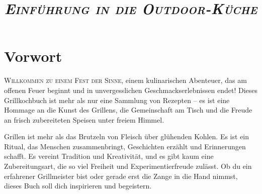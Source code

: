 \documentclass[pdftext, bcor=7mm, ngerman]{scrbook}
\begin{document}





\begin{titlepage}
	\subject{\huge\textsc{\emph{Kochen in kurzen Hosen}}}
	\title{\Huge\textrm{\textsc{\emph{Einführung in die Outdoor-Küche}}}}
    \date{}
\end{titlepage}
\dedication{Für meine Familie und lieben Freunde, \\
die mutig und selbstlos die neusten Kreationen kosten\\}

\maketitle



\frontmatter




\chapter{Vorwort}
\lettrine[lines=3]{W}{illkommen zu einem Fest der Sinne,} einem kulinarischen Abenteuer, das am offenen Feuer beginnt und in 
unvergesslichen Geschmackserlebnissen endet! Dieses Grillkochbuch ist mehr als nur eine Sammlung von Rezepten – es ist eine 
Hommage an die Kunst des Grillens, die Gemeinschaft am Tisch und die Freude an frisch zubereiteten Speisen unter freiem Himmel.

Grillen ist mehr als das Brutzeln von Fleisch über glühenden Kohlen. Es ist ein Ritual, das Menschen zusammenbringt, Geschichten 
erzählt und Erinnerungen schafft. Es vereint Tradition und Kreativität, und es gibt kaum eine Zubereitungsart, die so viel Freiheit und 
Experimentierfreude zulässt. Ob du ein erfahrener Grillmeister bist oder gerade erst die Zange in die Hand nimmst, dieses Buch soll dich 
inspirieren und begeistern.
\end{document}

